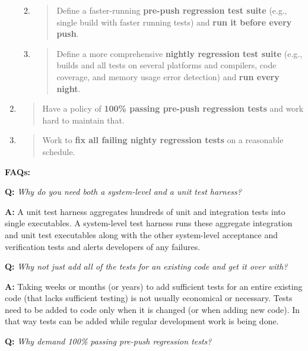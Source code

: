 \documentclass[]{article}
\begin{document}
\begin{enumerate}
  \begin{enumerate}
  \def\labelenumii{\alph{enumii}.}
  \item
    \begin{quote}
    Define a faster-running \textbf{pre-push regression test suite}
    (e.g., single build with faster running tests) and \textbf{run it
    before every push}.
    \end{quote}
  \item
    \begin{quote}
    Define a more comprehensive \textbf{nightly regression test suite}
    (e.g., builds and all tests on several platforms and compilers, code
    coverage, and memory usage error detection) and \textbf{run every
    night}.
    \end{quote}
  \end{enumerate}
\item
  \begin{quote}
  Have a policy of \textbf{100\% passing pre-push regression tests} and
  work hard to maintain that.
  \end{quote}
\item
  \begin{quote}
  Work to \textbf{fix all failing nighty regression tests} on a
  reasonable schedule.
  \end{quote}
\end{enumerate}

\textbf{FAQs:}

\textbf{Q:} \emph{Why do you need both a system-level and a unit test
harness?}

\textbf{A:} A unit test harness aggregates hundreds of unit and
integration tests into single executables. A system-level test harness
runs these aggregate integration and unit test executables along with
the other system-level acceptance and verification tests and alerts
developers of any failures.

\textbf{Q:} \emph{Why not just add all of the tests for an existing code
and get it over with?}

\textbf{A:} Taking weeks or months (or years) to add sufficient tests
for an entire existing code (that lacks sufficient testing) is not
usually economical or necessary. Tests need to be added to code only
when it is changed (or when adding new code). In that way tests can be
added while regular development work is being done.

\textbf{Q:} \emph{Why demand 100\% passing pre-push regression tests?}
\end{document}
